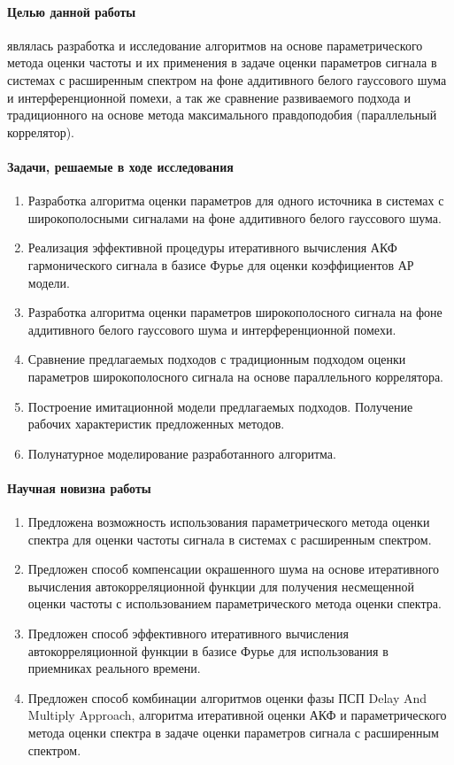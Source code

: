 \paragraph{Целью данной работы} являлась разработка и исследование алгоритмов на основе параметрического метода оценки частоты 
и их применения в задаче оценки параметров сигнала в системах с расширенным спектром на фоне аддитивного белого гауссового шума и интерференционной помехи,
а так же сравнение развиваемого подхода и традиционного на основе метода максимального правдоподобия (параллельный коррелятор).

\paragraph{Задачи, решаемые в ходе исследования}
\begin{enumerate}
	\item {Разработка алгоритма оценки параметров для одного источника в системах с широкополосными сигналами на фоне аддитивного
		белого гауссового шума.}
	\item {Реализация эффективной процедуры итеративного вычисления АКФ гармонического сигнала в базисе Фурье для оценки коэффициентов АР модели.}
	\item {Разработка алгоритма оценки параметров широкополосного сигнала на фоне аддитивного белого гауссового шума и
		интерференционной помехи.}
	\item {Сравнение предлагаемых подходов с традиционным подходом оценки параметров широкополосного сигнала на основе параллельного коррелятора.}
	\item {Построение имитационной модели предлагаемых подходов. Получение рабочих характеристик предложенных методов.}
	\item {Полунатурное моделирование разработанного алгоритма.}
\end{enumerate}

\paragraph{Научная новизна работы}
\begin{enumerate}
	\item{Предложена возможность использования параметрического метода оценки спектра для оценки частоты сигнала в системах с расширенным спектром.}
	\item{Предложен способ компенсации окрашенного шума на основе итеративного вычисления автокорреляционной функции для
		получения несмещенной оценки частоты с использованием параметрического метода оценки спектра.}
	\item{Предложен способ эффективного итеративного вычисления автокорреляционной функции в базисе Фурье для использования в
		приемниках реального времени.}
	\item{Предложен способ комбинации алгоритмов оценки фазы ПСП Delay And Multiply Approach, алгоритма итеративной оценки АКФ и
		параметрического метода оценки спектра в задаче оценки параметров сигнала с расширенным спектром.}
\end{enumerate}


